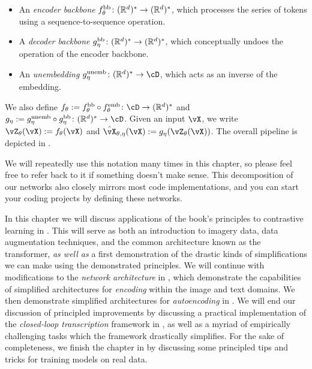 \documentclass[../../book-main.tex]{subfiles}
\begin{document}
\begin{itemize}
\begin{itemize}
        \item An \textit{encoder backbone} \(f_{\theta}^{\mathrm{bb}} \colon (\mathbb{R}^{d})^{*} \to (\mathbb{R}^{d})^{*}\), which processes the series of tokens using a sequence-to-sequence operation.
        \item A \textit{decoder backbone} \(g_{\eta}^{\mathrm{bb}} \colon (\mathbb{R}^{d})^{*} \to (\mathbb{R}^{d})^{*}\), which conceptually undoes the operation of the encoder backbone.
        \item An \textit{unembedding} \(g_{\eta}^{\unemb} \colon (\R^{d})^{*} \to \cD\), which acts as an inverse of the embedding.
    \end{itemize}
    We also define \(f_{\theta} := f_{\theta}^{\backbone} \circ f_{\theta}^{\emb} \colon \cD \to (\R^{d})^{*}\) and \(g_{\eta} := g_{\eta}^{\unemb} \circ g_{\eta}^{\backbone} \colon (\R^{d})^{*} \to \cD\). Given an input \(\vX\), we write \(\vZ_{\theta}(\vX) := f_{\theta}(\vX)\) and \(\hat{\vX}_{\theta, \eta}(\vX) := g_{\eta}(\vZ_{\theta}(\vX))\). The overall pipeline is depicted in .
\end{itemize}

We will repeatedly use this notation many times in this chapter, so please feel free to refer back to it if something doesn't make sense. This decomposition of our networks also closely mirrors most code implementations, and you can start your coding projects by defining these networks.

In this chapter we will discuss applications of the book's principles to contrastive learning in . This will serve as both an introduction to imagery data, data augmentation techniques, and the common architecture known as the transformer, \textit{as well as} a first demonstration of the drastic kinds of simplifications we can make using the demonstrated principles. We will continue with modifications to the \textit{network architecture} in , which demonstrate the capabilities of simplified architectures for \textit{encoding} within the image and text domains. We then demonstrate simplified architectures for \textit{autoencoding} in . We will end our discussion of principled improvements by discussing a practical implementation of the \textit{closed-loop transcription} framework in , as well as a myriad of empirically challenging tasks which the framework drastically simplifies. For the sake of completeness, we finish the chapter in  by discussing some principled tips and tricks for training models on real data.
\end{document}
